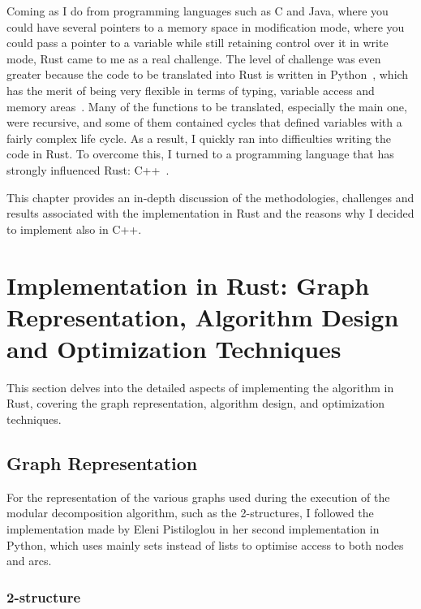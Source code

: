 Coming as I do from programming languages such as C and Java, where you could have several pointers to a memory space in modification mode, where you could pass a pointer to a variable while still retaining control over it in write mode, Rust came to me as a real challenge.
The level of challenge was even greater because the code to be translated into Rust is written in Python~\cite{pythoncode}, which has the merit of being very flexible in terms of typing, variable access and memory areas~\cite{python}.
Many of the functions to be translated, especially the main one, were recursive, and some of them contained cycles that defined variables with a fairly complex life cycle.
As a result, I quickly ran into difficulties writing the code in Rust.
To overcome this, I turned to a programming language that has strongly influenced Rust: C++~\cite{cpp}.

This chapter provides an in-depth discussion of the methodologies, challenges and results associated with the implementation in Rust and the reasons why I decided to implement also in C++.


\section{Implementation in Rust: Graph Representation, Algorithm Design and Optimization Techniques}\label{sec:implementation-in-rust:-graph-representation-algorithm-design-and-optimization-techniques}

This section delves into the detailed aspects of implementing the algorithm in Rust, covering the graph representation, algorithm design, and optimization techniques.

\subsection{Graph Representation}\label{subsec:graph-representation}

For the representation of the various graphs used during the execution of the modular decomposition algorithm, such as the 2-structures, I followed the implementation made by Eleni Pistiloglou in her second implementation in Python, which uses mainly sets instead of lists to optimise access to both nodes and arcs.

\subsubsection{2-structure}

